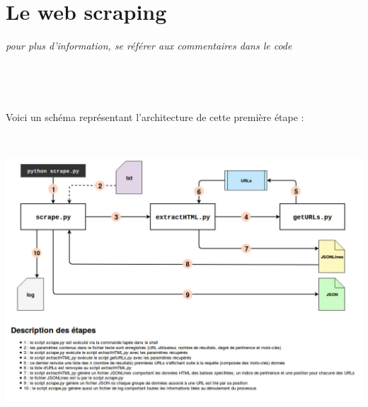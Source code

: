 \documentclass[12pt]{article}
\begin{document}

\newpage
\section{Le web scraping}

\textit{pour plus d'information, se référer aux commentaires dans le code}

\

\

Voici un schéma représentant l'architecture de cette première étape :

\

\begin{center}
\includegraphics[scale=0.45]{architectureScraping.jpg}
\end{center}
\end{document}
